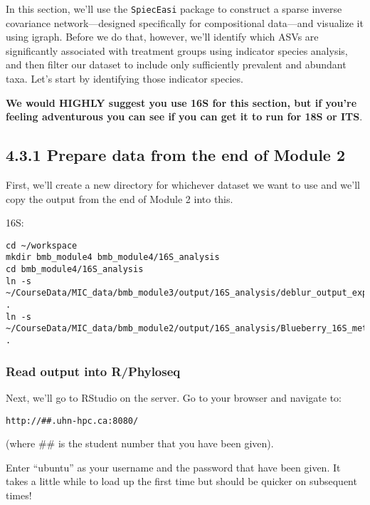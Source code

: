 \documentclass[
]{book}
\begin{document}
In this section, we'll use the \texttt{SpiecEasi} package to construct a sparse inverse covariance network---designed specifically for compositional data---and visualize it using igraph. Before we do that, however, we'll identify which ASVs are significantly associated with treatment groups using indicator species analysis, and then filter our dataset to include only sufficiently prevalent and abundant taxa. Let's start by identifying those indicator species.

\textbf{We would HIGHLY suggest you use 16S for this section, but if you're feeling adventurous you can see if you can get it to run for 18S or ITS}.

\subsection{4.3.1 Prepare data from the end of Module 2}\label{prepare-data-from-the-end-of-module-2-1}

First, we'll create a new directory for whichever dataset we want to use and we'll copy the output from the end of Module 2 into this.

16S:

\begin{verbatim}
cd ~/workspace
mkdir bmb_module4 bmb_module4/16S_analysis
cd bmb_module4/16S_analysis
ln -s ~/CourseData/MIC_data/bmb_module3/output/16S_analysis/deblur_output_exported/ .
ln -s ~/CourseData/MIC_data/bmb_module2/output/16S_analysis/Blueberry_16S_metadata.tsv .
\end{verbatim}

\subsubsection{Read output into R/Phyloseq}\label{read-output-into-rphyloseq-1}

Next, we'll go to RStudio on the server. Go to your browser and navigate to:

\begin{verbatim}
http://##.uhn-hpc.ca:8080/
\end{verbatim}

(where \#\# is the student number that you have been given).

Enter ``ubuntu'' as your username and the password that have been given. It takes a little while to load up the first time but should be quicker on subsequent times!
\end{document}
